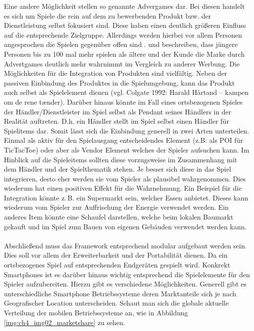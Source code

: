 Eine andere Möglichkeit stellen so genannte Advergames dar. Bei diesen handelt es sich um Spiele die rein auf dem zu bewerbenden Produkt bzw. der Dienstleistung selbst fokusiert sind. Diese haben einen deutlich größeren Einfluss auf die entsprechende Zielgruppe. Allerdings werden hierbei vor allem Personen angesprochen die Spielen gegenüber offen sind \cite{Winkler.2006}. \textcite{Chen.2001} und \textcite{Dahl.2009} beschreiben, dass jüngere Personen bis zu 100 mal mehr spielen als ältere und der Kunde die Marke durch Advertgames deutlich mehr wahrnimmt im Vergleich zu anderer Werbung.
Die Möglichkeiten für die Integration von Produkten sind vielfältig. Neben der passiven Einbindung des Produktes in die Spielumgebung, kann das Produkt auch selbst als Spielelement dienen (vgl. Colgate 1992: Harald Hårtand -- kampen om de rene tænder).
Darüber hinaus könnte im Fall eines ortsbezogenen Spieles der Händler/Dienstleister im Spiel selbst als Pendant seines Händlers in der Realität auftreten. D.h. ein Händler stellt im Spiel selbst einen Händler für Spielitems dar.
Somit lässt sich die Einbindung generell in zwei Arten unterteilen. Einmal als aktiv für den Spielausgang entscheidendes Element (z.B: als POI für TicTacToe) oder aber als Vendor Element welches der Spieler aufsuchen kann.
Im Hinblick auf die Spieleitems sollten diese vorzugsweise im Zusammenhang mit dem Händler und der Spielthematik stehen. Je besser sich diese in das Spiel integrieren, desto eher werden sie vom Spieler als plausibel wahrgenommen. Dies wiederum hat einen positiven Effekt für die Wahrnehmung.
Ein Beispiel für die Integration könnte z.\,B. ein Supermarkt sein, welcher Essen anbietet. Dieses kann wiederum vom Spieler zur Auffrischung der Energie verwendet werden. Ein anderes Item könnte eine Schaufel darstellen, welche beim lokalen Baumarkt gekauft und im Spiel zum Bauen von eigenen Gebäuden verwendet werden kann.
\\\\
Abschließend muss das Framework entsprechend modular aufgebaut werden sein. Dies soll vor allem der Erweiterbarkeit und der Portabilität dienen. Da ein ortsbezogenes Spiel auf entsprechenden Endgeräten gespielt wird. Konkrekt Smartphones ist es darüber hinaus wichtig entsprechend die Spielelemente für den Spieler aufzubereiten. Hierzu gibt es verschiedene Möglichkeiten.
Generell gibt es unterschiedliche Smartphone Betriebssysteme deren Marktanteile sich je nach Geografischer Location unterscheiden.
Schaut man sich die globale aktuelle Verteilung der mobilen Betriebssysteme an, wie in Abbildung \ref{img:ch4_img02_marketshare} zu sehen.

